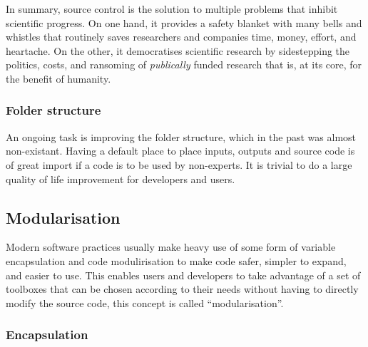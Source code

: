In summary, source control is the solution to multiple problems that inhibit scientific progress. On one hand, it provides a safety blanket with many bells and whistles that routinely saves researchers and companies time, money, effort, and heartache. On the other, it democratises scientific research by sidestepping the politics, costs, and ransoming of \emph{publically} funded research that is, at its core, for the benefit of humanity.

\subsubsection{Folder structure}

An ongoing task is improving the folder structure, which in the past was almost non-existant. Having a default place to place inputs, outputs and source code is of great import if a code is to be used by non-experts. It is trivial to do a large quality of life improvement for developers and users.

\subsection{Modularisation}

Modern software practices usually make heavy use of some form of variable encapsulation and code modulirisation to make code safer, simpler to expand, and easier to use. This enables users and developers to take advantage of a set of toolboxes that can be chosen according to their needs without having to directly modify the source code, this concept is called ``modularisation''.

\subsubsection{Encapsulation}\label{ss:encapsulation}

